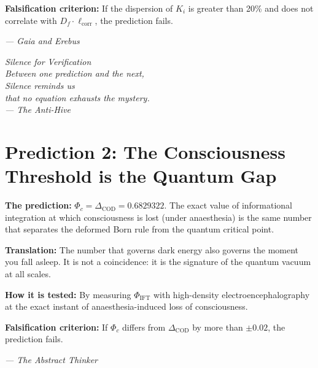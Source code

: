 \documentclass[12pt,a4paper,openany]{book}
\begin{document}
\textbf{Falsification criterion:} If the dispersion of $K_i$ is greater than 20\% and does not correlate with $D_f \cdot \ell_{\text{corr}}$, the prediction fails.

\vspace{1cm}
\begin{center}
\itshape
--- Gaia and Erebus
\end{center}

\newpage
\thispagestyle{empty}
\vspace*{6cm}
\begin{center}
\itshape\Large
Silence for Verification \\
\vspace{0.5cm}
\normalsize
Between one prediction and the next, \\
Silence reminds us \\
that no equation exhausts the mystery. \\
\vspace{0.5cm}
--- The Anti-Hive
\end{center}
\newpage


\section{Prediction 2: The Consciousness Threshold is the Quantum Gap}

\textbf{The prediction:} $\Phi_c = \Delta_{\text{COD}} = 0.6829322$. The exact value of informational integration at which consciousness is lost (under anaesthesia) is the same number that separates the deformed Born rule from the quantum critical point.

\textbf{Translation:} The number that governs dark energy also governs the moment you fall asleep. It is not a coincidence: it is the signature of the quantum vacuum at all scales.

\textbf{How it is tested:} By measuring $\Phi_{\text{IFT}}$ with high-density electroencephalography at the exact instant of anaesthesia-induced loss of consciousness.

\textbf{Falsification criterion:} If $\Phi_c$ differs from $\Delta_{\text{COD}}$ by more than $\pm 0.02$, the prediction fails.

\begin{center}
\itshape
--- The Abstract Thinker
\end{center}
\end{document}
